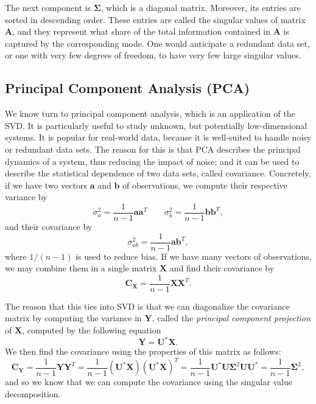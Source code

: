 \documentclass[a4paper,10 pt]{article}
\begin{document}
The next component is $\mathbf{\Sigma}$, which is a diagonal matrix. Moreover, its entries are sorted in descending order. These entries are called the singular values of matrix $\mathbf{A}$, and they represent what share of the total information contained in $\mathbf{A}$ is captured by the corresponding mode. One would anticipate a redundant data set, or one with very few degrees of freedom, to have very few large singular values.

\subsection{Principal Component Analysis (PCA)}
We know turn to principal component analysis, which is an application of the SVD. It is particularly useful to study unknown, but potentially low-dimensional systems. It is popular for real-world data, because it is well-suited to handle noisy or redundant data sets. The reason for this is that PCA describes the principal dynamics of a system, thus reducing the impact of noise; and it can be used to describe the statistical dependence of two data sets, called covariance. Concretely, if we have two vectors $\mathbf{a}$ and $\mathbf{b}$ of observations, we compute their respective variance by
\begin{equation}
    \sigma^2_a = \frac{1}{n-1}\mathbf{aa}^T\quad\quad\sigma^2_b = \frac{1}{n-1}\mathbf{bb}^T,
\end{equation}
and their covariance by
\begin{equation}
    \sigma^2_{ab} = \frac{1}{n-1}\mathbf{ab}^T,
\end{equation}
where $1/(n-1)$ is used to reduce bias. If we have many vectors of observations, we may combine them in a single matrix $\mathbf{X}$ and find their covariance by
\begin{equation}
    \mathbf{C_X} = \frac{1}{n-1}\mathbf{XX}^T.
\end{equation}

The reason that this ties into SVD is that we can diagonalize the covariance matrix by computing the variance in $\mathbf{Y}$, called the \emph{principal component projection} of $\mathbf{X}$, computed by the following equation
\begin{equation}
    \mathbf{Y} = \mathbf{U^*X}.
\end{equation}
We then find the covariance using the properties of this matrix as follows:
\begin{equation}
    \mathbf{C_Y} = \frac{1}{n-1}\mathbf{YY}^T = \frac{1}{n-1}(\mathbf{U^*X})(\mathbf{U^*X})^T = \frac{1}{n-1}\mathbf{U}^*\mathbf{U}\mathbf{\Sigma}^2\mathbf{UU}^* = \frac{1}{n-1}\mathbf{\Sigma}^2,
\end{equation}
and so we know that we can compute the covariance using the singular value decomposition.
\end{document}
